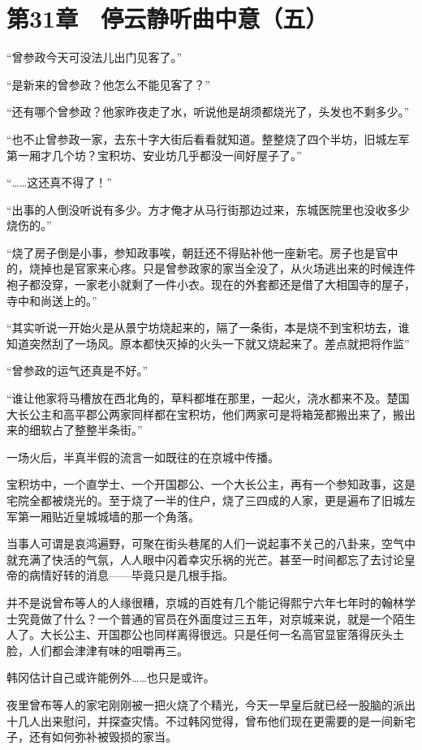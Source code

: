 \section{第31章　停云静听曲中意（五）}

“曾参政今天可没法儿出门见客了。”

“是新来的曾参政？他怎么不能见客了？”

“还有哪个曾参政？他家昨夜走了水，听说他是胡须都烧光了，头发也不剩多少。”

“也不止曾参政一家，去东十字大街后看看就知道。整整烧了四个半坊，旧城左军第一厢才几个坊？宝积坊、安业坊几乎都没一间好屋子了。”

“……这还真不得了！”

“出事的人倒没听说有多少。方才俺才从马行街那边过来，东城医院里也没收多少烧伤的。”

“烧了房子倒是小事，参知政事唉，朝廷还不得贴补他一座新宅。房子也是官中的，烧掉也是官家来心疼。只是曾参政家的家当全没了，从火场逃出来的时候连件袍子都没穿，一家老小就剩了一件小衣。现在的外套都还是借了大相国寺的屋子，寺中和尚送上的。”

“其实听说一开始火是从景宁坊烧起来的，隔了一条街，本是烧不到宝积坊去，谁知道突然刮了一场风。原本都快灭掉的火头一下就又烧起来了。差点就把将作监”

“曾参政的运气还真是不好。”

“谁让他家将马槽放在西北角的，草料都堆在那里，一起火，浇水都来不及。楚国大长公主和高平郡公两家同样都在宝积坊，他们两家可是将箱笼都搬出来了，搬出来的细软占了整整半条街。”

一场火后，半真半假的流言一如既往的在京城中传播。

宝积坊中，一个直学士、一个开国郡公、一个大长公主，再有一个参知政事，这是宅院全都被烧光的。至于烧了一半的住户，烧了三四成的人家，更是遍布了旧城左军第一厢贴近皇城城墙的那一个角落。

当事人可谓是哀鸿遍野，可聚在街头巷尾的人们一说起事不关己的八卦来，空气中就充满了快活的气氛，人人眼中闪着幸灾乐祸的光芒。甚至一时间都忘了去讨论皇帝的病情好转的消息——毕竟只是几根手指。

并不是说曾布等人的人缘很糟，京城的百姓有几个能记得熙宁六年七年时的翰林学士究竟做了什么？一个普通的官员在外面度过三五年，对京城来说，就是一个陌生人了。大长公主、开国郡公也同样离得很远。只是任何一名高官显宦落得灰头土脸，人们都会津津有味的咀嚼再三。

韩冈估计自己或许能例外……也只是或许。

夜里曾布等人的家宅刚刚被一把火烧了个精光，今天一早皇后就已经一股脑的派出十几人出来慰问，并探查灾情。不过韩冈觉得，曾布他们现在更需要的是一间新宅子，还有如何弥补被毁损的家当。

